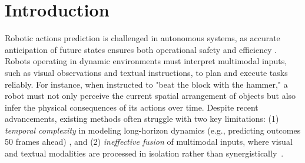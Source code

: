 \section{Introduction}
\label{sec:intro}

Robotic actions prediction is challenged in autonomous systems, 
  as accurate anticipation of future states ensures both operational safety and efficiency 
  \cite{Wang2025LevelGround,TimeSeriesPredictiveControlRobotics2024}.
Robots operating in dynamic environments must interpret multimodal inputs, 
  such as visual observations and textual instructions, 
    to plan and execute tasks reliably. 
For instance, when instructed to "beat the block with the hammer," 
  a robot must not only perceive the current spatial arrangement of objects 
    but also infer the physical consequences of its actions over time. 
Despite recent advancements, 
  existing methods often struggle with two key limitations: 
  (1) \textit{temporal complexity} in modeling long-horizon dynamics 
  (e.g., predicting outcomes 50 frames ahead)
  \cite{TimeSeriesPredictiveControlRobotics2024}, and 
  (2) \textit{ineffective fusion} of multimodal inputs, 
    where visual and textual modalities are processed in isolation 
      rather than synergistically~\cite{liu2025bidirectional,xia2025phoenixmotionbasedselfreflectionframework}.

